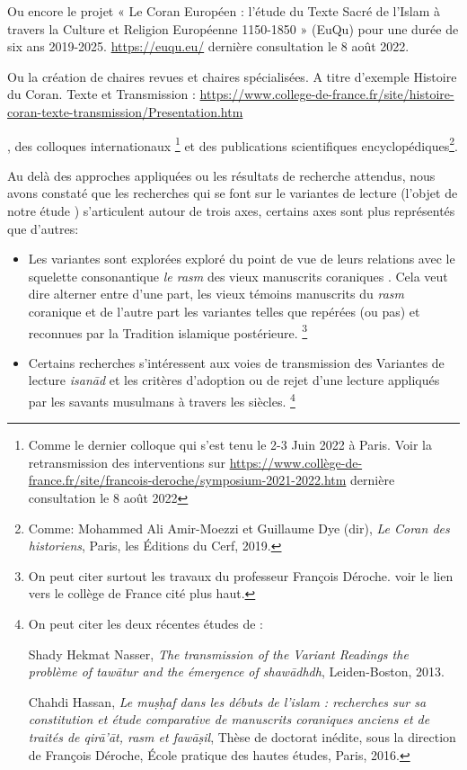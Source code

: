\documentclass[a4paper,12pt]{report}
\begin{document}
\begin{itemize}
{Ou encore le projet « Le Coran Européen : l’étude du Texte Sacré de l’Islam à travers la Culture et Religion Européenne 1150-1850 » (EuQu) pour une durée de six ans 2019-2025. \url{https://euqu.eu/} dernière consultation le 8 août 2022. 

Ou la création de chaires revues et chaires spécialisées. A titre d'exemple Histoire du  Coran. Texte et Transmission : 
\url{ https://www.college-de-france.fr/site/histoire-coran-texte-transmission/Presentation.htm}  } , des colloques internationaux \footnote{ Comme  le dernier colloque qui s'est tenu le 2-3 Juin 2022 à Paris.
Voir la retransmission des interventions sur  \url{https://www.collège-de-france.fr/site/francois-deroche/symposium-2021-2022.htm} dernière consultation le 8 août 2022} et des publications scientifiques encyclopédiques\footnote{Comme: Mohammed Ali Amir-Moezzi et Guillaume Dye (dir), \textit{Le Coran des historiens}, Paris, les Éditions du Cerf, 2019.}.   

Au delà des approches appliquées ou les résultats de recherche attendus, nous avons constaté  que les recherches qui se font sur le variantes de lecture (l'objet de notre étude ) s'articulent autour de  trois axes, certains axes sont plus représentés que d'autres:   

\begin{itemize}
    

 \item 	Les variantes  sont explorées exploré du point de vue de leurs relations avec le squelette consonantique \textit{le rasm} des vieux manuscrits coraniques . Cela veut dire alterner entre d’une part, les vieux témoins manuscrits du \textit{rasm }coranique  et de l’autre part les variantes telles que repérées (ou pas) et reconnues  par la Tradition islamique postérieure. \footnote{ On peut citer surtout les travaux du professeur François Déroche. voir le lien vers le collège de France cité plus haut. }  

 \item   Certains recherches s'intéressent aux voies de transmission des Variantes de lecture  \textit{isanād } et  les critères d’adoption  ou de rejet d’une lecture  appliqués par les savants musulmans à travers les siècles.  \footnote{ On peut citer les deux récentes études de : 

 Shady Hekmat Nasser, \textit{The transmission of the Variant Readings the problème of tawātur and the émergence of shawādhdh}, Leiden-Boston, 2013.

 Chahdi  Hassan, \textit{Le muṣḥaf dans les débuts de l'islam : recherches sur sa constitution et étude comparative de manuscrits coraniques anciens et de traités de qirā'āt, rasm et fawāṣil}, Thèse de doctorat inédite, sous la direction de François Déroche, École pratique des hautes études, Paris, 2016. 
 
}
\end{itemize}
\end{itemize}
\end{document}
